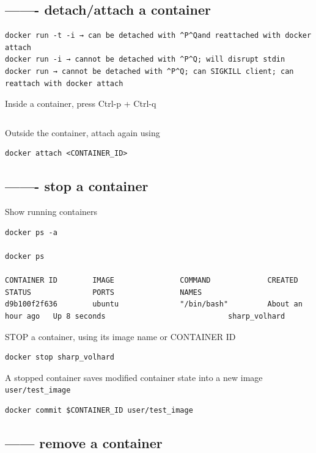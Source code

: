 \subsection{------- detach/attach a container}

\begin{verbatim}
docker run -t -i → can be detached with ^P^Qand reattached with docker attach
docker run -i → cannot be detached with ^P^Q; will disrupt stdin
docker run → cannot be detached with ^P^Q; can SIGKILL client; can reattach with docker attach
\end{verbatim}

Inside a container, press Ctrl-p + Ctrl-q
\begin{verbatim}

\end{verbatim}

Outside the container, attach again using 
\begin{verbatim}
docker attach <CONTAINER_ID>
\end{verbatim}


\subsection{------- stop a container}

Show running containers
\begin{verbatim}
docker ps -a

docker ps

CONTAINER ID        IMAGE               COMMAND             CREATED             STATUS              PORTS               NAMES
d9b100f2f636        ubuntu              "/bin/bash"         About an hour ago   Up 8 seconds                            sharp_volhard

\end{verbatim}

STOP a container, using its image name or CONTAINER ID

\begin{verbatim}
docker stop sharp_volhard
\end{verbatim}


A stopped container 
saves modified container state into a new image \verb!user/test_image!

\begin{verbatim}
docker commit $CONTAINER_ID user/test_image
\end{verbatim}

\subsection{------ remove a container}


